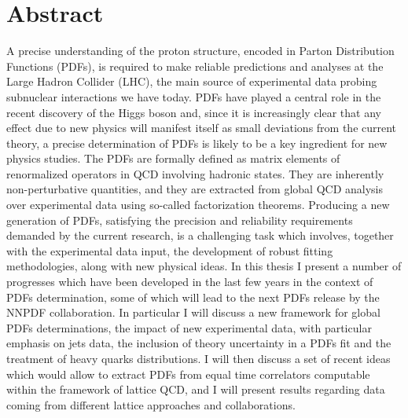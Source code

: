 \chapter*{Abstract}
A precise understanding of the proton structure, encoded in Parton Distribution Functions (PDFs), is required 
to make reliable predictions and analyses at the Large Hadron Collider (LHC), 
the main source of experimental data probing subnuclear interactions we have today.
PDFs have played a central role in the recent 
discovery of the Higgs boson and, since it is increasingly clear that any effect due to new physics 
will manifest itself as small deviations from the current theory, 
a precise determination of PDFs is likely to be a key ingredient 
for new physics studies.
%
The PDFs are formally defined as matrix elements of renormalized operators in QCD involving hadronic states.
They are inherently non-perturbative quantities, and they are extracted from global QCD analysis over
experimental data using so-called factorization theorems. 
Producing a new generation of PDFs, satisfying the precision and reliability requirements demanded by the current research,
is a challenging task which involves, together with the experimental data input, the development of robust
fitting methodologies, along with new physical ideas. 
%
In this thesis I present a number of progresses which have been developed in the last few years in the context of 
PDFs determination, some of which will lead to the next PDFs release by the NNPDF collaboration. 
In particular I will discuss a new framework for global PDFs determinations, the impact of new experimental data,
with particular emphasis on jets data, the inclusion of theory uncertainty in a PDFs fit 
and the treatment of heavy quarks distributions.
%
I will then discuss a set of recent ideas which would allow to extract PDFs from equal time correlators computable 
within the framework of lattice QCD, and I will present results regarding data coming from different 
lattice approaches and collaborations.

